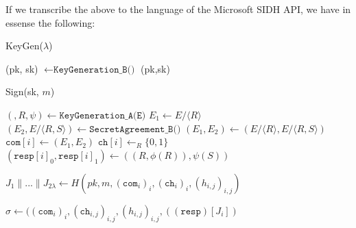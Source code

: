 If we transcribe the above to the language of the Microsoft SIDH API, we have in essense the following:\\

\begin{algorithm}
\caption{KeyGen($\lambda$)}\label{euclid}
\begin{algorithmic}[1]
\State (pk, sk) $\gets \texttt{KeyGeneration\_B()}$
\State \Return (pk,sk)
\end{algorithmic}
\end{algorithm}

\begin{algorithm}
\caption{Sign(sk, $m$)}\label{euclid}
\begin{algorithmic}[1]
	\State $(, R, \psi) \gets \texttt{KeyGeneration\_A(E)}$
	\State $E_{1} \gets E/\langle R \rangle$
	\State $(E_{2},E/\langle R,S \rangle) \gets \texttt{SecretAgreement\_B()}$
	\State $(E_{1},E_{2}) \gets (E/\langle R \rangle, E/\langle R,S \rangle)$
	\State $\texttt{com}[i] \gets (E_{1}, E_{2})$
	\State $\texttt{ch}[i] \gets_{R} \{0,1\}$
	\State $(\texttt{resp}[i]_{0}, \texttt{resp}[i]_{1}) \gets ((R,\phi(R)), \psi(S))$
	
\EndFor

\State $J_{1} \parallel ... \parallel J_{2\lambda} \gets H(pk, m, (\texttt{com}_{i})_{i},(\texttt{ch}_{i})_{i},(h_{i,j})_{i,j})$

\State \Return $\sigma \gets ((\texttt{com}_{i})_{i}, (\texttt{ch}_{i,j})_{i,j}, (h_{i,j})_{i,j}, ((\texttt{resp})[J_{i}])$
\end{algorithmic}
\end{algorithm}
